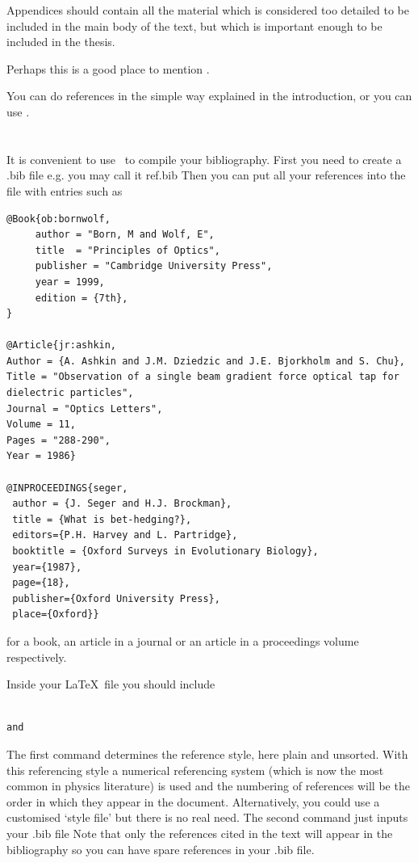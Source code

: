 \documentclass[12pt,a4paper]{report}
\begin{document}
Appendices should contain all the material which is considered too
detailed to be included in the main body of the text, but which is
important enough to be included in the thesis.

Perhaps this is a good place to mention \BibTeX.

You can do references in the simple way explained in the introduction,
or you can use \BibTeX.


\section{\BibTeX}
\label{sec:bibtex}

It is convenient to use \BibTeX\ to compile your bibliography.  First
you need to create a .bib file e.g.  you may call it ref.bib Then you
can put all your references into the file with entries such as
\begin{verbatim}
@Book{ob:bornwolf,
     author = "Born, M and Wolf, E",
     title  = "Principles of Optics",
     publisher = "Cambridge University Press",
     year = 1999,
     edition = {7th},
}

@Article{jr:ashkin,
Author = {A. Ashkin and J.M. Dziedzic and J.E. Bjorkholm and S. Chu},
Title = "Observation of a single beam gradient force optical tap for 
dielectric particles",
Journal = "Optics Letters",
Volume = 11,
Pages = "288-290",
Year = 1986}

@INPROCEEDINGS{seger,
 author = {J. Seger and H.J. Brockman},
 title = {What is bet-hedging?},
 editors={P.H. Harvey and L. Partridge},
 booktitle = {Oxford Surveys in Evolutionary Biology},
 year={1987},
 page={18},
 publisher={Oxford University Press},
 place={Oxford}}
\end{verbatim}
for a book, an article in a journal or an article in a proceedings volume
respectively.

Inside your \LaTeX\ file
you should include 
\begin{verbatim}
                      
and

\end{verbatim}
The first command determines the reference style, here plain and 
unsorted. With this referencing style 
a numerical referencing system (which is now the most
common in physics literature) is used and the numbering of references
will be the order in which they appear in the document. Alternatively, 
you could use
a customised `style file' but there is no real need.  The second
command just inputs your .bib file Note that only the references cited
in the text will appear in the bibliography so you can have spare
references in your .bib file.
\end{document}
